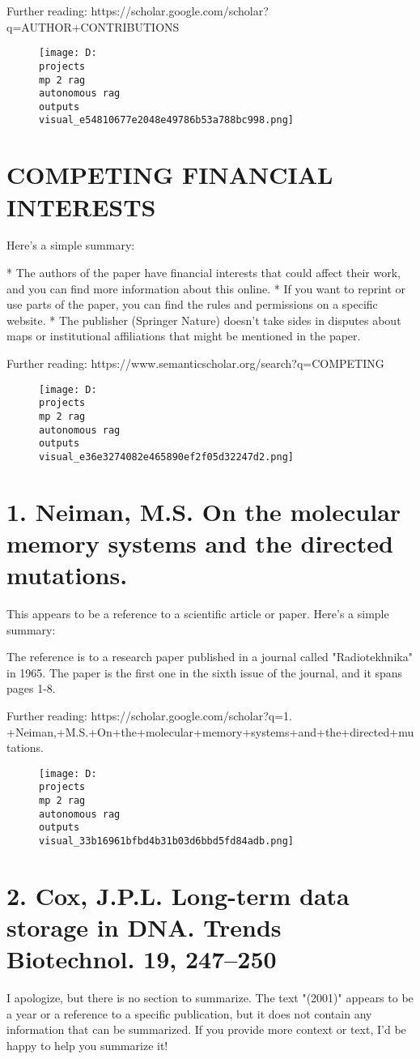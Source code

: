 \documentclass[12pt,a4paper]{article}
\begin{document}
Further reading: https://scholar.google.com/scholar?q=AUTHOR+CONTRIBUTIONS
\begin{figure}[h]
\centering
\texttt{[image: D:\\projects\\mp 2 rag\\autonomous rag\\outputs\\visual\_e54810677e2048e49786b53a788bc998.png]}
\end{figure}
\section{COMPETING FINANCIAL INTERESTS}
Here's a simple summary:

* The authors of the paper have financial interests that could affect their work, and you can find more information about this online.
* If you want to reprint or use parts of the paper, you can find the rules and permissions on a specific website.
* The publisher (Springer Nature) doesn't take sides in disputes about maps or institutional affiliations that might be mentioned in the paper.

Further reading: https://www.semanticscholar.org/search?q=COMPETING%
\begin{figure}[h]
\centering
\texttt{[image: D:\\projects\\mp 2 rag\\autonomous rag\\outputs\\visual\_e36e3274082e465890ef2f05d32247d2.png]}
\end{figure}
\section{1.	 Neiman, M.S. On the molecular memory systems and the directed mutations.}
This appears to be a reference to a scientific article or paper. Here's a simple summary:

The reference is to a research paper published in a journal called "Radiotekhnika" in 1965. The paper is the first one in the sixth issue of the journal, and it spans pages 1-8.

Further reading: https://scholar.google.com/scholar?q=1.	+Neiman,+M.S.+On+the+molecular+memory+systems+and+the+directed+mutations.
\begin{figure}[h]
\centering
\texttt{[image: D:\\projects\\mp 2 rag\\autonomous rag\\outputs\\visual\_33b16961bfbd4b31b03d6bbd5fd84adb.png]}
\end{figure}
\section{2.	 Cox, J.P.L. Long-term data storage in DNA. Trends Biotechnol. 19, 247–250}
I apologize, but there is no section to summarize. The text "(2001)" appears to be a year or a reference to a specific publication, but it does not contain any information that can be summarized. If you provide more context or text, I'd be happy to help you summarize it!
\end{document}
